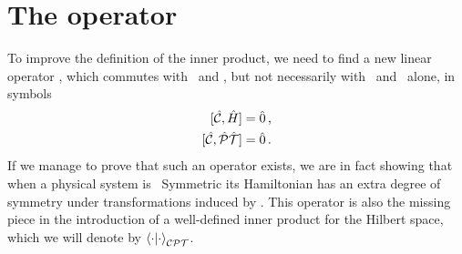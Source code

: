     \section{The \texorpdfstring{\hC}{C} operator}
        To improve the definition of the inner product, we need to find a new linear operator \hC, which commutes with \hH\ and \hPT, but not necessarily with \hP\ and \hT\ alone, in symbols
        \begin{align}
            \label{eq:C-H-commutator}
            \comm*{\hC}{\hH}\! &= \hzero
            \mycomma
            \\
            \label{eq:C-PT-commutator}
            \comm*{\hC}{\hPT}\! &= \hzero
            \myperiod
        \end{align}
        If we manage to prove that such an operator exists, we are in fact showing that when a physical system is \hPT\ Symmetric its Hamiltonian has an extra degree of symmetry under transformations induced by \hC. This operator is also the missing piece in the introduction of a well-defined inner product for the Hilbert space, which we will denote by $\braket{\cdot}{\cdot}_{\mathcal{C}\mathcal{P}\mathcal{T}}$.

